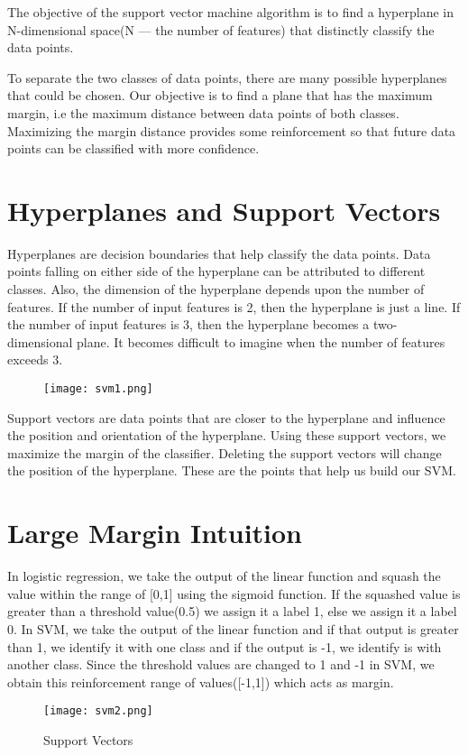   The objective of the support vector machine algorithm is to find a hyperplane in N-dimensional space(N — the number of features) that distinctly classify the data points.

  To separate the two classes of data points, there are many possible hyperplanes that could be chosen. Our objective is to find a plane that has the maximum margin, i.e the maximum distance between data points of both classes. Maximizing the margin distance provides some reinforcement so that future data points can be classified with more confidence.

  \section{Hyperplanes and Support Vectors}

      Hyperplanes are decision boundaries that help classify the data points. Data points falling on either side of the hyperplane can be attributed to different classes. Also, the dimension of the hyperplane depends upon the number of features. If the number of input features is 2, then the hyperplane is just a line. If the number of input features is 3, then the hyperplane becomes a two-dimensional plane. It becomes difficult to imagine when the number of features exceeds 3.

      \begin{figure}[h]
          \centering
        \texttt{[image: svm1.png]}
    \end{figure}

      Support vectors are data points that are closer to the hyperplane and influence the position and orientation of the hyperplane. Using these support vectors, we maximize the margin of the classifier. Deleting the support vectors will change the position of the hyperplane. These are the points that help us build our SVM.

  \section{Large Margin Intuition}
      In logistic regression, we take the output of the linear function and squash the value within the range of [0,1] using the sigmoid function. If the squashed value is greater than a threshold value(0.5) we assign it a label 1, else we assign it a label 0. In SVM, we take the output of the linear function and if that output is greater than 1, we identify it with one class and if the output is -1, we identify is with another class. Since the threshold values are changed to 1 and -1 in SVM, we obtain this reinforcement range of values([-1,1]) which acts as margin.


      \begin{figure}[h]
          \centering
        \texttt{[image: svm2.png]}
        \caption{Support Vectors}
    \end{figure}
      

